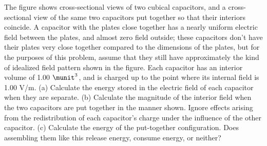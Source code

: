 The figure shows cross-sectional views of two cubical
capacitors, and a cross-sectional view of the same two
capacitors put together so that their interiors coincide. A
capacitor with the plates close together has a nearly
uniform electric field between the plates, and almost zero
field outside; these capacitors don't have their plates very
close together compared to the dimensions of the plates, but
for the purposes of this problem, assume that they still
have approximately the kind of idealized field pattern shown
in the figure. Each capacitor has an interior volume of 1.00
$\munit^3$, and is charged up to the point where its internal
field is 1.00 V/m. (a) Calculate the energy stored in the
electric field of each capacitor when they are separate. (b)
Calculate the magnitude of the interior field when the two
capacitors are put together in the manner shown. Ignore
effects arising from the redistribution of each capacitor's
charge under the influence of the other capacitor. (c)
Calculate the energy of the put-together configuration. Does
assembling them like this release energy, consume energy, or neither?\answercheck\hwendpart
